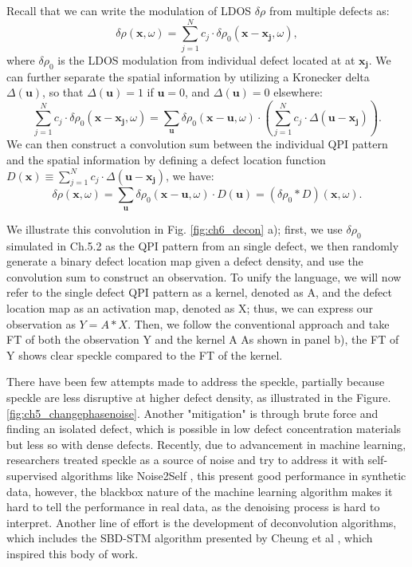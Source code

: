 \par \noindent Recall that we can write the modulation of \ac{LDOS} $\delta \rho$ from multiple defects as:
\begin{equation}
	\delta \rho(\mathbf{x}, \omega) = \sum_{j=1}^{N}c_j \cdot \delta \rho_0(\mathbf{x}-\mathbf{x_j},\omega),
\end{equation}
\noindent where $\delta \rho_0$ is the \ac{LDOS} modulation from individual defect located at at $\mathbf{x_j}$. We can further separate the spatial information by utilizing a Kronecker delta $\Delta(\mathbf{u})$, so that $\Delta(\mathbf{u})=1$ if $\mathbf{u} = 0$, and $\Delta(\mathbf{u})=0$ elsewhere: 
\begin{equation}
	\sum_{j=1}^{N}c_j \cdot \delta \rho_0(\mathbf{x}-\mathbf{x_j},\omega) = \sum_{\mathbf{u}} \delta \rho_0(\mathbf{x}-\mathbf{u},\omega)\cdot(\sum_{j=1}^{N} c_j \cdot \Delta(\mathbf{u-x_j})).
\end{equation}
\noindent We can then construct a convolution sum between the individual \ac{QPI} pattern and the spatial information by defining a defect location function $D(\mathbf{x}) \equiv \sum_{j=1}^{N} c_j \cdot \Delta(\mathbf{u-x_j})$, we have: 
\begin{equation}
	\delta \rho(\mathbf{x}, \omega) =  \sum_{\mathbf{u}} \delta \rho_0(\mathbf{x}-\mathbf{u},\omega)\cdot D(\mathbf{u}) = (\delta \rho_0 *D)(\mathbf{x}, \omega).
\end{equation}

We illustrate this convolution in Fig. \ref{fig:ch6_decon} a); first, we use $\delta \rho_0$ simulated in Ch.5.2 as the \ac{QPI} pattern from an single defect, we then randomly generate a binary defect location map given a defect density, and use the convolution sum to construct an observation. To unify the language, we will now refer to the single defect \ac{QPI} pattern as a kernel, denoted as A, and the defect location map as an activation map, denoted as X; thus, we can express our observation as $Y = A * X$. Then, we follow the conventional approach and take \ac{FT} of both the observation Y and the kernel A As shown in panel b), the \ac{FT} of Y shows clear speckle compared to the \ac{FT} of the kernel.

There have been few attempts made to address the speckle, partially because speckle are less disruptive at higher defect density, as illustrated in the Figure. \ref{fig:ch5_changephasenoise}. Another "mitigation" is through brute force and finding an isolated defect, which is possible in low defect concentration materials but less so with dense defects. Recently, due to advancement in machine learning, researchers treated speckle as a source of noise and try to address it with self-supervised algorithms like Noise2Self \cite{kuijfSelfsupervisedLearningDenoising2025}, this present good performance in synthetic data, however, the blackbox nature of the machine learning algorithm makes it hard to tell the performance in real data, as the denoising process is hard to interpret. Another line of effort is the development of deconvolution algorithms, which includes the SBD-STM algorithm presented by Cheung et al \cite{cheungDictionaryLearningFouriertransform2020}, which inspired this body of work.
 

